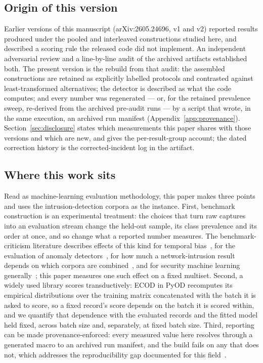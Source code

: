 \documentclass[manuscript,screen,nonacm]{acmart}
\begin{document}
\subsection*{Origin of this version}
Earlier versions of this manuscript (arXiv:2605.24696, v1 and v2) reported results produced under the pooled
and interleaved constructions studied here, and described a scoring rule the
released code did not implement. An independent adversarial review and a
line-by-line audit of the archived artifacts established both. The present
version is the rebuild from that audit: the assembled constructions are
retained as explicitly labelled protocols and contrasted against
least-transformed alternatives; the detector is described as what the code
computes; and every number was regenerated --- or, for the retained prevalence
sweep, re-derived from the archived pre-audit runs --- by a script that wrote,
in the same execution, an archived run manifest
(Appendix~\ref{app:provenance}).
Section~\ref{sec:disclosure} states which measurements this paper shares with
those versions and which are new, and gives the per-result-group account; the
dated correction history is the corrected-incident log in the artifact.

\subsection*{Where this work sits}
Read as machine-learning evaluation methodology, this paper makes three points
and uses the intrusion-detection corpora as the instance. First, benchmark
construction is an experimental treatment: the choices that turn raw captures
into an evaluation stream change the held-out sample, its class prevalence and
its order at once, and so change what a reported number measures. The
benchmark-criticism literature describes effects of this kind for temporal
bias~\citep{pendlebury2019tesseract}, for the evaluation of anomaly
detectors~\citep{campos2016evaluation,wu2023flawed}, for how much a
network-intrusion result depends on which corpora are
combined~\citep{apruzzese2022crosseval}, and for security machine learning
generally~\citep{arp2022dosdonts,catillo2023hype}; this paper measures one
such effect on a fixed multiset. Second, a widely used library scores
transductively: ECOD in PyOD recomputes its empirical distributions over the
training matrix concatenated with the batch it is asked to score, so a fixed
record's score depends on the batch it is scored within, and we quantify that
dependence with the evaluated records and the fitted model held fixed, across
batch size and, separately, at fixed batch size. Third, reporting can be made
provenance-enforced: every measured value here resolves through a generated
macro to an archived run manifest, and the build fails on any that does not,
which addresses the reproducibility gap documented for this
field~\citep{olszewski2023reproducibility}.
\end{document}
